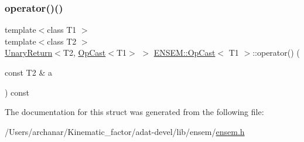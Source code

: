 \subsubsection{\texorpdfstring{operator()()}{operator()()}\hspace{0.1cm}{\footnotesize\ttfamily [3/3]}}
{\footnotesize\ttfamily template$<$class T1 $>$ \\
template$<$class T2 $>$ \\
\mbox{\hyperlink{structENSEM_1_1UnaryReturn}{Unary\+Return}}$<$T2, \mbox{\hyperlink{structENSEM_1_1OpCast}{Op\+Cast}}$<$T1$>$ $>$ \mbox{\hyperlink{structENSEM_1_1OpCast}{E\+N\+S\+E\+M\+::\+Op\+Cast}}$<$ T1 $>$\+::operator() (\begin{DoxyParamCaption}\item[{const T2 \&}]{a }\end{DoxyParamCaption}) const\hspace{0.3cm}{\ttfamily [inline]}}



The documentation for this struct was generated from the following file\+:\begin{DoxyCompactItemize}
\item 
/\+Users/archanar/\+Kinematic\+\_\+factor/adat-\/devel/lib/ensem/\mbox{\hyperlink{adat-devel_2lib_2ensem_2ensem_8h}{ensem.\+h}}\end{DoxyCompactItemize}
